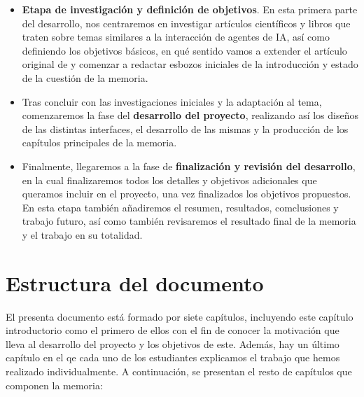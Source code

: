 \begin{itemize}
	
	\item \textbf{Etapa de investigación y definición de objetivos}. En esta primera parte del desarrollo, nos centraremos en investigar artículos científicos y libros que traten sobre temas similares a la interacción de agentes de IA, así como definiendo los objetivos básicos, en qué sentido vamos a extender el artículo original de \ga y comenzar a redactar esbozos iniciales de la introducción y estado de la cuestión de la memoria.
	
	\item Tras concluir con las investigaciones iniciales y la adaptación al tema, comenzaremos la fase del \textbf{desarrollo del proyecto}, realizando así los diseños de las distintas interfaces, el desarrollo de las mismas y la producción de los capítulos principales de la memoria.
	
	\item Finalmente, llegaremos a la fase de \textbf{finalización y revisión del desarrollo}, en la cual finalizaremos todos los detalles y objetivos adicionales que queramos incluir en el proyecto, una vez finalizados los objetivos propuestos. En esta etapa también añadiremos el resumen, resultados, comclusiones y trabajo futuro, así como también revisaremos el resultado final de la memoria y el trabajo en su totalidad.
\end{itemize}



\section{Estructura del documento}
El presenta documento está formado por siete capítulos, incluyendo este capítulo introductorio como el primero de ellos con el fin de conocer la motivación que lleva al desarrollo del proyecto y los objetivos de este. Además, hay un último capítulo en el qe cada uno de los estudiantes explicamos el trabajo que hemos realizado individualmente. A continuación, se presentan el resto de capítulos que componen la memoria: 

